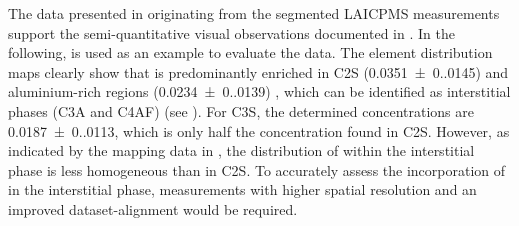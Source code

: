 The data presented in  originating from the segmented \ac{LAICPMS} measurements support the semi-quantitative visual observations documented in .
In the following,  is used as an example to evaluate the data.
The element distribution maps clearly show that  is predominantly enriched in \ac{C2S} (\qty{0.0351(0.0145)}{\wtpercent}) and aluminium-rich regions (\qty{0.0234(0.0139)}{\wtpercent}) , which can be identified as interstitial phases (\ac{C3A} and \ac{C4AF}) (see ).
For \ac{C3S}, the determined  concentrations are \qty{0.0187(0.0113)}{\wtpercent}, which is only half the concentration found in \ac{C2S}.
However, as indicated by the mapping data in , the distribution of  within the interstitial phase is less homogeneous than in \ac{C2S}.
To accurately assess the incorporation of  in the interstitial phase, measurements with higher spatial resolution and an improved dataset-alignment would be required.

